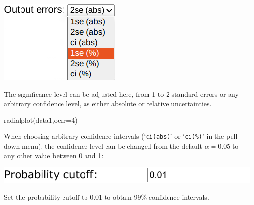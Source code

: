 \begin{refsection}
\begin{enumerate}
\noindent\begin{minipage}[t]{.25\linewidth}
\strut\vspace*{-\baselineskip}\newline
\includegraphics[width=\linewidth]{../figures/oerr.png}
\end{minipage}
\begin{minipage}[t]{.75\linewidth}
  The significance level can be adjusted here, from 1 to 2 standard
  errors or any arbitrary confidence level, as either absolute or
  relative uncertainties.
\end{minipage}

\begin{console}
radialplot(data1,oerr=4)
\end{console}

When choosing arbitrary confidence intervals (`\texttt{ci(abs)}' or
`\texttt{ci(\%)}' in the pull-down menu), the confidence level can be
changed from the default $\alpha=0.05$ to any other value between 0
and 1:

\noindent\begin{minipage}[t]{.5\linewidth}
\strut\vspace*{-\baselineskip}\newline
\includegraphics[width=\linewidth]{../figures/OtherRadialAlpha.png}
\end{minipage}
\begin{minipage}[t]{.5\linewidth}
Set the probability cutoff to 0.01 to obtain 99\% confidence
intervals.
\end{minipage}


\end{enumerate}
\end{refsection}
